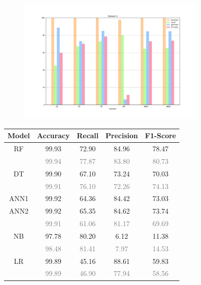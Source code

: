 \documentclass{Configuration_Files/PoliMi3i_thesis}
\begin{document}
\begin{figure}[H]
\centering
\begin{subfigure}
    \centering
    \includegraphics[scale=0.3]{Images/Dataset_4.png}
\end{subfigure}

\renewcommand{\arraystretch}{0.8}%
\begin{table}[H]
\centering 
    \begin{tabular}{ c  c  c  c  c }
    \hline 
    \textbf{Model}  & \textbf{Accuracy} & \textbf{Recall} & \textbf{Precision} & \textbf{F1-Score} \\
    \hline
    RF	& 99.93 &	72.90 &	84.96 &	78.47 \\
        & \footnotesize\textcolor{gray}{99.94} & \footnotesize\textcolor{gray}{77.87} & \footnotesize\textcolor{gray}{83.80} & \footnotesize\textcolor{gray}{80.73} \\[0.01cm]
    DT	& 99.90 &	67.10 &	73.24 &	70.03 \\
        & \footnotesize\textcolor{gray}{99.91} & \footnotesize\textcolor{gray}{76.10} & \footnotesize\textcolor{gray}{72.26} & \footnotesize\textcolor{gray}{74.13} \\
    ANN1 & 99.92 & 64.36 & 84.42 & 73.03 \\
    ANN2 & 99.92 & 65.35 & 84.62 & 73.74 \\
         & \footnotesize\textcolor{gray}{99.91} & \footnotesize\textcolor{gray}{61.06} & \footnotesize\textcolor{gray}{81.17} & \footnotesize\textcolor{gray}{69.69} \\
    NB	& 97.78 &	80.20 &	6.12 &	11.38 \\
        & \footnotesize\textcolor{gray}{98.48} & \footnotesize\textcolor{gray}{81.41} & \footnotesize\textcolor{gray}{7.97} & \footnotesize\textcolor{gray}{14.53} \\
    LR	& 99.89 &	45.16 &	88.61 &	59.83 \\
        & \footnotesize\textcolor{gray}{99.89} & \footnotesize\textcolor{gray}{46.90} & \footnotesize\textcolor{gray}{77.94} & \footnotesize\textcolor{gray}{58.56} \\
    \hline
    \end{tabular}
\end{table}


\end{figure}
\end{document}
